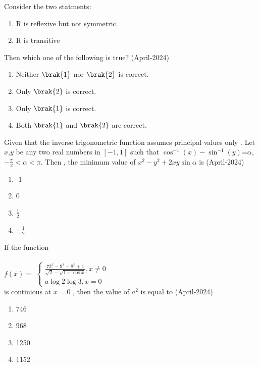 Consider the two statments:
\begin{enumerate}
\item R is reflexive but not symmetric.
\item R is transitive
\end{enumerate}
Then which one of the following is true?
\hfill{(April-2024)}
\begin{multicols}{2}
\begin{enumerate}
\item Neither $\brak{1}$ nor $\brak{2}$ is correct. 
\item Only $\brak{2}$ is correct.
\item Only $\brak{1}$ is correct. 
\item Both $\brak{1}$ and $\brak{2}$ are correct.
\end{enumerate}
\end{multicols}
\item Given that the inverse trigonometric function assumes principal values only . Let $x$,$y$ be any two real numbers in $[-1,1]$ such that  $\cos^{-1}(x)-\sin^{-1}(y)$=$\alpha $,$-\frac{\pi}{2}<\alpha<\pi$.
Then , the minimum value of $x^2-y^2+2xy\sin{\alpha}$ is 
\hfill{(April-2024)}
\begin{multicols}{2}
\begin{enumerate}
\item -1
\item 0
\item $\frac{1}{2}$
\item $-\frac{1}{2}$
\end{enumerate}
\end{multicols}
\item If the function\\
\\$f(x)=$
$ \begin{cases}
   \frac{72^x-9^x-8^x+1}{\sqrt{2}-\sqrt{1+\cos{x}}},x \neq 0\\
   a\log2\log3,x=0
\end{cases} $ \\
is continious at $x=0$ , then the value of $a^2$ is equal to 
\hfill{(April-2024)}
\begin{multicols}{2}
\begin{enumerate}
\item 746
\item 968 
\item 1250
\item 1152
\end{enumerate}
\end{multicols}
